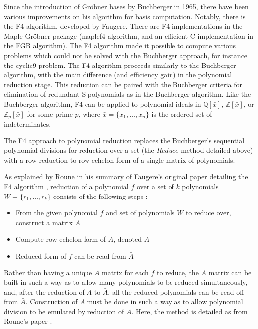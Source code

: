 \documentclass[letterpaper,12pt,titlepage,oneside,final]{book}
\begin{document}
Since the introduction of Gr\"obner bases by Buchberger in 1965, there have been various improvements on his algorithm for basis computation.  Notably, there is the F4 algorithm, developed by Faugere.  There are F4 implementations in the Maple Gr\"obner package (maplef4 algorithm, and an efficient C implementation in the FGB algorithm).  The F4 algorithm made it possible to compute various problems which could not be solved with the Buchberger approach, for instance the cyclic9 problem.  The F4 algorithm proceeds similarly to the Buchberger algorithm, with the main difference (and efficiency gain) in the polynomial reduction stage.  This reduction can be paired with the Buchberger criteria for elimination of redundant S-polynomials as in the Buchberger algorithm.  Like the Buchberger algorithm, F4 can be applied to polynomial ideals in ${\mathbb{Q}[\bar x]}$, ${\mathbb{Z}[\bar x]}$, or ${\mathbb{Z}_p[\bar x]}$ for some prime ${p}$, where ${\bar x = \{x_1, \ldots, x_n\}}$ is the ordered set of indeterminates.   

The F4 approach to polynomial reduction replaces the Buchberger's sequential polynomial divisions for reduction over a set (the ${Reduce}$ method detailed above) with a row reduction to row-echelon form of a single matrix of polynomials.

As explained by Roune in his summary of Faugere's original paper detailing the F4 algorithm \cite{faugere}, reduction of a polynomial ${f}$ over a set of ${k}$ polynomials ${W = \{r_1, \ldots, r_k\}}$ consists of the following steps \cite{Roune}:
\begin{itemize}
  \item From the given polynomial ${f}$ and set of polynomials ${W}$ to reduce over, construct a matrix ${A}$
  \item Compute row-echelon form of ${A}$, denoted ${\bar A}$
  \item Reduced form of ${f}$ can be read from ${\bar A}$
\end{itemize}      

Rather than having a unique ${A}$ matrix for each ${f}$ to reduce, the ${A}$ matrix can be built in such a way as to allow many polynomials to be reduced simultaneously, and, after the reduction of ${A}$ to ${\bar A}$, all the reduced polynomials can be read off from ${\bar A}$.  Construction of ${A}$ must be done in such a way as to allow polynomial division to be emulated by reduction of ${A}$.  Here, the method is detailed as from Roune's paper \cite{Roune}.
\end{document}
